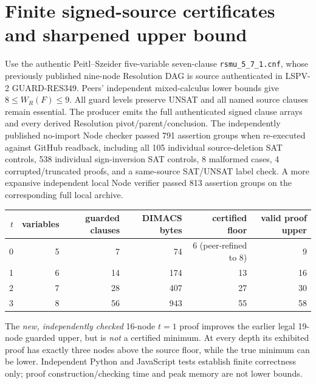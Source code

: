 \documentclass[11pt]{article}
\begin{document}
\section*{Finite signed-source certificates and sharpened upper bound}
Use the authentic Peitl--Szeider five-variable seven-clause \texttt{rsmu\_5\_7\_1.cnf}, whose previously published nine-node Resolution DAG is source authenticated in LSPV-2 GUARD-RES349. Peers' independent mixed-calculus lower bounds give $8\le W_R(F)\le9$. All guard levels preserve UNSAT and all named source clauses remain essential. The producer emits the full authenticated signed clause arrays and every derived Resolution pivot/parent/conclusion. The independently published no-import Node checker passed 791 assertion groups when re-executed against GitHub readback, including all 105 individual source-deletion SAT controls, 538 individual sign-inversion SAT controls, 8 malformed cases, 4 corrupted/truncated proofs, and a same-source SAT/UNSAT label check. A more expansive independent local Node verifier passed 813 assertion groups on the corresponding full local archive.
\begin{center}\begin{tabular}{rrrrrr}\toprule
$t$&variables&guarded clauses&DIMACS bytes&certified floor&valid proof upper\\\midrule
0&5&7&74&6 (peer-refined to 8)&9\\
1&6&14&174&13&16\\
2&7&28&407&27&30\\
3&8&56&943&55&58\\\bottomrule\end{tabular}\end{center}
The \emph{new, independently checked} 16-node $t=1$ proof improves the earlier legal 19-node guarded upper, but is \emph{not} a certified minimum. At every depth its exhibited proof has exactly three nodes above the source floor, while the true minimum can be lower. Independent Python and JavaScript tests establish finite correctness only; proof construction/checking time and peak memory are not lower bounds.
\end{document}
